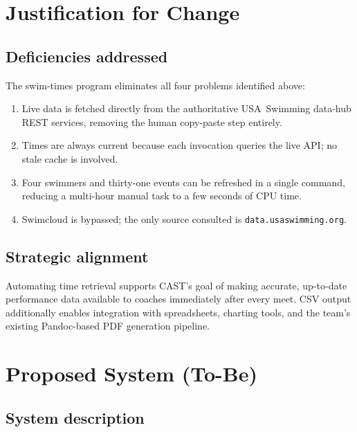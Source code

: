\documentclass[12pt]{article}
\begin{document}
\section{Justification for Change}

\subsection{Deficiencies addressed}

The swim-times program eliminates all four problems identified above:

\begin{enumerate}
  \item Live data is fetched directly from the authoritative
        USA~Swimming data-hub REST services, removing the human
        copy-paste step entirely.
  \item Times are always current because each invocation queries
        the live API; no stale cache is involved.
  \item Four swimmers and thirty-one events can be refreshed in a
        single command, reducing a multi-hour manual task to a few
        seconds of CPU time.
  \item Swimcloud is bypassed; the only source consulted is
        \texttt{data.usaswimming.org}.
\end{enumerate}

\subsection{Strategic alignment}

Automating time retrieval supports CAST's goal of making accurate,
up-to-date performance data available to coaches immediately after
every meet.  CSV output additionally enables integration with
spreadsheets, charting tools, and the team's existing Pandoc-based
PDF generation pipeline.

\section{Proposed System (To-Be)}

\subsection{System description}
\end{document}
